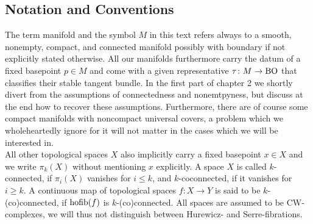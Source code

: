 \subsection{Notation and Conventions}
The term manifold and the symbol $M$ in this text refers always to a smooth, nonempty, compact, and connected manifold possibly with boundary if not explicitly stated otherwise. All our manifolds furthermore carry the datum of a fixed basepoint $p\in M$ and come with a given representative $\tau\colon M \to \mathrm{B}\mathrm{O}$ that classifies their stable tangent bundle.
In the first part of chapter 2 we shortly divert from the assumptions of connectedness and nonemtpyness, but discuss at the end how to recover these assumptions.
Furthermore, there are of course some compact manifolds with noncompact universal covers, a problem which we wholeheartedly ignore for it will not matter in the cases which we will be interested in.\\
All other topological spaces $X$ also implicitly carry a fixed basepoint $x\in X$ and we write $\pi_k(X)$ without mentioning $x$ explicitly.
A space $X$ is called $k$-connected, if $\pi_i(X)$ vanishes for $i\leq k$, and $k$-coconnected, if it vanishes for $i\geq k$.
A continuous map of topological spaces $f\colon X\to Y$ is said to be $k$-(co)connected, if $\operatorname{hofib}(f)$ is $k$-(co)connected.
All spaces are assumed to be CW-complexes, we will thus not distinguish between Hurewicz- and Serre-fibrations.
\pagebreak{}

